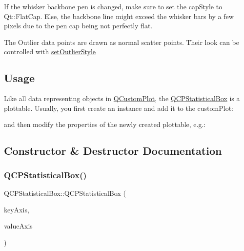 If the whisker backbone pen is changed, make sure to set the cap\+Style to Qt\+::\+Flat\+Cap. Else, the backbone line might exceed the whisker bars by a few pixels due to the pen cap being not perfectly flat.

The Outlier data points are drawn as normal scatter points. Their look can be controlled with \hyperlink{class_q_c_p_statistical_box_ad5241943422eb8e58360a97e99ad6aa7}{set\+Outlier\+Style}\hypertarget{class_q_c_p_statistical_box_usage}{}\subsection{Usage}\label{class_q_c_p_statistical_box_usage}
Like all data representing objects in \hyperlink{class_q_custom_plot}{Q\+Custom\+Plot}, the \hyperlink{class_q_c_p_statistical_box}{Q\+C\+P\+Statistical\+Box} is a plottable. Usually, you first create an instance and add it to the custom\+Plot\+: 
\begin{DoxyCodeInclude}
\end{DoxyCodeInclude}
and then modify the properties of the newly created plottable, e.\+g.\+: 
\begin{DoxyCodeInclude}
\end{DoxyCodeInclude}


\subsection{Constructor \& Destructor Documentation}
\hypertarget{class_q_c_p_statistical_box_a75c2b3e7fcd0741cc981693a2ba63b27}{}\label{class_q_c_p_statistical_box_a75c2b3e7fcd0741cc981693a2ba63b27} 
\subsubsection{\texorpdfstring{Q\+C\+P\+Statistical\+Box()}{QCPStatisticalBox()}}
{\footnotesize\ttfamily Q\+C\+P\+Statistical\+Box\+::\+Q\+C\+P\+Statistical\+Box (\begin{DoxyParamCaption}\item[{\hyperlink{class_q_c_p_axis}{Q\+C\+P\+Axis} $\ast$}]{key\+Axis,  }\item[{\hyperlink{class_q_c_p_axis}{Q\+C\+P\+Axis} $\ast$}]{value\+Axis }\end{DoxyParamCaption})\hspace{0.3cm}{\ttfamily [explicit]}}

